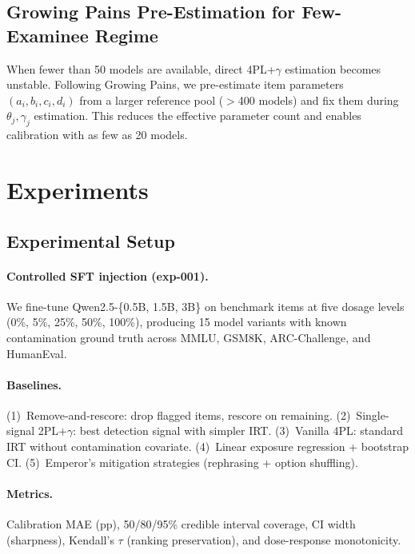 \documentclass[letterpaper,11pt]{article}
\begin{document}
\subsection{Growing Pains Pre-Estimation for Few-Examinee Regime}

When fewer than 50 models are available, direct 4PL+$\gamma$ estimation becomes unstable. Following Growing Pains, we pre-estimate item parameters $(a_i, b_i, c_i, d_i)$ from a larger reference pool ($>$400 models) and fix them during $\theta_j, \gamma_j$ estimation. This reduces the effective parameter count and enables calibration with as few as 20 models.

\section{Experiments}

\subsection{Experimental Setup}

\paragraph{Controlled SFT injection (exp-001).}
We fine-tune Qwen2.5-\{0.5B, 1.5B, 3B\} on benchmark items at five dosage levels (0\%, 5\%, 25\%, 50\%, 100\%), producing 15 model variants with known contamination ground truth across MMLU, GSM8K, ARC-Challenge, and HumanEval.

\paragraph{Baselines.}
(1)~Remove-and-rescore: drop flagged items, rescore on remaining.
(2)~Single-signal 2PL+$\gamma$: best detection signal with simpler IRT.
(3)~Vanilla 4PL: standard IRT without contamination covariate.
(4)~Linear exposure regression + bootstrap CI.
(5)~Emperor's mitigation strategies (rephrasing + option shuffling).

\paragraph{Metrics.}
Calibration MAE (pp), 50/80/95\% credible interval coverage, CI width (sharpness), Kendall's $\tau$ (ranking preservation), and dose-response monotonicity.

\end{document}
